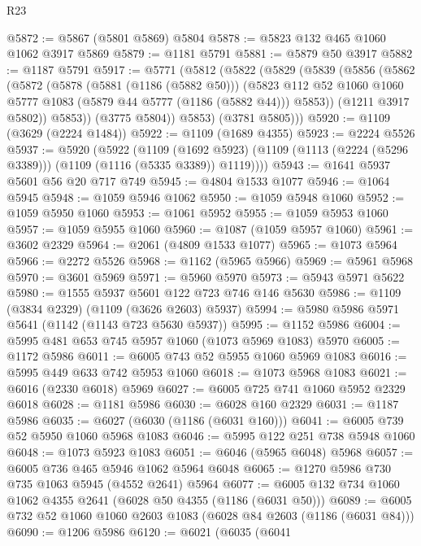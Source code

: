 \begin{lexlean}{R23}
\begin{coremodule}
@5872 := @5867 (@5801 @5869) @5804
@5878 := @5823 @132 @465 @1060 @1062 @3917 @5869
@5879 := @1181 @5791
@5881 := @5879 @50 @3917
@5882 := @1187 @5791
@5917 := @5771
    (@5812
      (@5822
        (@5829
          (@5839
            (@5856
              (@5862
                (@5872
                  (@5878
                    (@5881 (@1186 (@5882 @50)))
                    (@5823
                      @112
                      @52
                      @1060
                      @1060
                      @5777
                      @1083
                      (@5879 @44 @5777 (@1186 (@5882 @44)))
                      @5853))
                  (@1211 @3917 @5802))
                @5853))
            (@3775 @5804))
          @5853)
        (@3781 @5805)))
@5920 := @1109 (@3629 (@2224 @1484))
@5922 := @1109 (@1689 @4355)
@5923 := @2224 @5526
@5937 := @5920
    (@5922
      (@1109
        (@1692 @5923)
        (@1109 (@1113 (@2224 (@5296 @3389))) (@1109 (@1116 (@5335 @3389)) @1119))))
@5943 := @1641 @5937 @5601 @56 @20 @717 @749
@5945 := @4804 @1533 @1077
@5946 := @1064 @5945
@5948 := @1059 @5946 @1062
@5950 := @1059 @5948 @1060
@5952 := @1059 @5950 @1060
@5953 := @1061 @5952
@5955 := @1059 @5953 @1060
@5957 := @1059 @5955 @1060
@5960 := @1087 (@1059 @5957 @1060)
@5961 := @3602 @2329
@5964 := @2061 (@4809 @1533 @1077)
@5965 := @1073 @5964
@5966 := @2272 @5526
@5968 := @1162 (@5965 @5966)
@5969 := @5961 @5968
@5970 := @3601 @5969
@5971 := @5960 @5970
@5973 := @5943 @5971 @5622
@5980 := @1555 @5937 @5601 @122 @723 @746 @146 @5630
@5986 := @1109 (@3834 @2329) (@1109 (@3626 @2603) @5937)
@5994 := @5980 @5986 @5971 @5641 (@1142 (@1143 @723 @5630 @5937))
@5995 := @1152 @5986
@6004 := @5995 @481 @653 @745 @5957 @1060 (@1073 @5969 @1083) @5970
@6005 := @1172 @5986
@6011 := @6005 @743 @52 @5955 @1060 @5969 @1083
@6016 := @5995 @449 @633 @742 @5953 @1060
@6018 := @1073 @5968 @1083
@6021 := @6016 (@2330 @6018) @5969
@6027 := @6005 @725 @741 @1060 @5952 @2329 @6018
@6028 := @1181 @5986
@6030 := @6028 @160 @2329
@6031 := @1187 @5986
@6035 := @6027 (@6030 (@1186 (@6031 @160)))
@6041 := @6005 @739 @52 @5950 @1060 @5968 @1083
@6046 := @5995 @122 @251 @738 @5948 @1060
@6048 := @1073 @5923 @1083
@6051 := @6046 (@5965 @6048) @5968
@6057 := @6005 @736 @465 @5946 @1062 @5964 @6048
@6065 := @1270 @5986 @730 @735 @1063 @5945 (@4552 @2641) @5964
@6077 := @6005 @132 @734 @1060 @1062 @4355 @2641 (@6028 @50 @4355 (@1186 (@6031 @50)))
@6089 := @6005 @732 @52 @1060 @1060 @2603 @1083 (@6028 @84 @2603 (@1186 (@6031 @84)))
@6090 := @1206 @5986
@6120 := @6021
    (@6035
      (@6041

\end{coremodule}
\end{lexlean}
